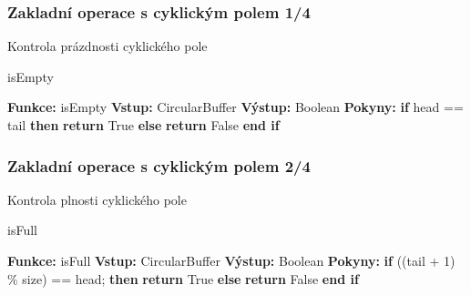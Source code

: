 \documentclass[]{fitthesispresn}
\begin{document}
    \begin{frame}
        \frametitle{Zakladní operace s cyklickým polem 1/4}
        Kontrola prázdnosti cyklického pole
        \begin{algorithm}[H]
            \caption{isEmpty}
            \label{alg:isempty}
            \begin{algorithmic}[1]
                \State \textbf{Funkce:} isEmpty
                \State \textbf{Vstup:} CircularBuffer
                \State \textbf{Výstup:} Boolean
                \State \textbf{Pokyny:}
                \State \hspace{\algorithmicindent} \textbf{if} head == tail \textbf{then}
                \State \hspace{\algorithmicindent} \hspace{\algorithmicindent} \textbf{return} True
                \State \hspace{\algorithmicindent} \textbf{else}
                \State \hspace{\algorithmicindent} \hspace{\algorithmicindent} \textbf{return} False
                \State \hspace{\algorithmicindent} \textbf{end if}
            \end{algorithmic}
        \end{algorithm}
    \end{frame}

    \begin{frame}
        \frametitle{Zakladní operace s cyklickým polem 2/4}
        Kontrola plnosti cyklického pole
        \begin{algorithm}[H]
            \caption{isFull}
            \label{alg:isfull}
            \begin{algorithmic}[1]
                \State \textbf{Funkce:} isFull
                \State \textbf{Vstup:} CircularBuffer
                \State \textbf{Výstup:} Boolean
                \State \textbf{Pokyny:}
                \State \hspace{\algorithmicindent} \textbf{if} ((tail + 1) \% size) == head; \textbf{then}
                \State \hspace{\algorithmicindent} \hspace{\algorithmicindent} \textbf{return} True
                \State \hspace{\algorithmicindent} \textbf{else}
                \State \hspace{\algorithmicindent} \hspace{\algorithmicindent} \textbf{return} False
                \State \hspace{\algorithmicindent} \textbf{end if}
            \end{algorithmic}
        \end{algorithm}
    \end{frame}
\end{document}
